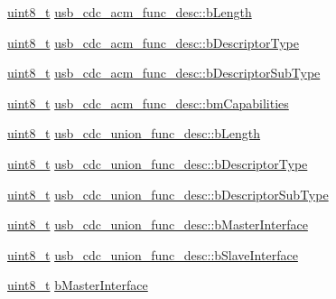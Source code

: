 \begin{DoxyCompactItemize}
\item 
\hyperlink{stdint_8h_aba7bc1797add20fe3efdf37ced1182c5}{uint8\-\_\-t} \hyperlink{group___p_i_o_s___u_s_b___d_e_f_s_gacda28d39ca47f4d77a24b7617ac2d693}{usb\-\_\-cdc\-\_\-acm\-\_\-func\-\_\-desc\-::b\-Length}
\item 
\hyperlink{stdint_8h_aba7bc1797add20fe3efdf37ced1182c5}{uint8\-\_\-t} \hyperlink{group___p_i_o_s___u_s_b___d_e_f_s_ga10040b1863323e237a9c86859baaecb4}{usb\-\_\-cdc\-\_\-acm\-\_\-func\-\_\-desc\-::b\-Descriptor\-Type}
\item 
\hyperlink{stdint_8h_aba7bc1797add20fe3efdf37ced1182c5}{uint8\-\_\-t} \hyperlink{group___p_i_o_s___u_s_b___d_e_f_s_ga08c4c22a13b05fac74e5f42a8a5bde68}{usb\-\_\-cdc\-\_\-acm\-\_\-func\-\_\-desc\-::b\-Descriptor\-Sub\-Type}
\item 
\hyperlink{stdint_8h_aba7bc1797add20fe3efdf37ced1182c5}{uint8\-\_\-t} \hyperlink{group___p_i_o_s___u_s_b___d_e_f_s_gae29c71f4304b1f38e5ffcaf34ec9b182}{usb\-\_\-cdc\-\_\-acm\-\_\-func\-\_\-desc\-::bm\-Capabilities}
\item 
\hyperlink{stdint_8h_aba7bc1797add20fe3efdf37ced1182c5}{uint8\-\_\-t} \hyperlink{group___p_i_o_s___u_s_b___d_e_f_s_ga2175f86e94200d579781fa41c37c9bc1}{usb\-\_\-cdc\-\_\-union\-\_\-func\-\_\-desc\-::b\-Length}
\item 
\hyperlink{stdint_8h_aba7bc1797add20fe3efdf37ced1182c5}{uint8\-\_\-t} \hyperlink{group___p_i_o_s___u_s_b___d_e_f_s_ga1f7c70ea92f6b53756b96cb3b3d791c6}{usb\-\_\-cdc\-\_\-union\-\_\-func\-\_\-desc\-::b\-Descriptor\-Type}
\item 
\hyperlink{stdint_8h_aba7bc1797add20fe3efdf37ced1182c5}{uint8\-\_\-t} \hyperlink{group___p_i_o_s___u_s_b___d_e_f_s_ga5784c9fea0c30db9be3ed5d38e02c4b7}{usb\-\_\-cdc\-\_\-union\-\_\-func\-\_\-desc\-::b\-Descriptor\-Sub\-Type}
\item 
\hyperlink{stdint_8h_aba7bc1797add20fe3efdf37ced1182c5}{uint8\-\_\-t} \hyperlink{group___p_i_o_s___u_s_b___d_e_f_s_ga9194ac785cd0cc798e0a438dbcab9062}{usb\-\_\-cdc\-\_\-union\-\_\-func\-\_\-desc\-::b\-Master\-Interface}
\item 
\hyperlink{stdint_8h_aba7bc1797add20fe3efdf37ced1182c5}{uint8\-\_\-t} \hyperlink{group___p_i_o_s___u_s_b___d_e_f_s_ga9cfe098c280a95412143266a948eb290}{usb\-\_\-cdc\-\_\-union\-\_\-func\-\_\-desc\-::b\-Slave\-Interface}
\item 
\hyperlink{stdint_8h_aba7bc1797add20fe3efdf37ced1182c5}{uint8\-\_\-t} \hyperlink{group___p_i_o_s___u_s_b___d_e_f_s_ga4ab108f916e137502b55f0324e594963}{b\-Master\-Interface}
\item 

\end{DoxyCompactItemize}
